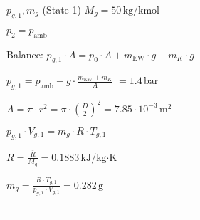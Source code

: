 \( p_{g,1}, m_g \) (State 1)  
\( M_g = 50 \, \text{kg/kmol} \)  

\( p_2 = p_{\text{amb}} \)  

Balance:  
\( p_{g,1} \cdot A = p_{\text{0}} \cdot A + m_{\text{EW}} \cdot g + m_K \cdot g \)  

\( p_{g,1} = p_{\text{amb}} + g \cdot \frac{m_{\text{EW}} + m_K}{A} \)  
\( = 1.4 \, \text{bar} \)  

\( A = \pi \cdot r^2 = \pi \cdot \left(\frac{D}{2}\right)^2 = 7.85 \cdot 10^{-3} \, \text{m}^2 \)  

\( p_{g,1} \cdot V_{g,1} = m_g \cdot R \cdot T_{g,1} \)  

\( R = \frac{\overline{R}}{M_g} = 0.1883 \, \text{kJ/kg·K} \)  

\( m_g = \frac{R \cdot T_{g,1}}{p_{g,1} \cdot V_{g,1}} = 0.282 \, \text{g} \)  

---